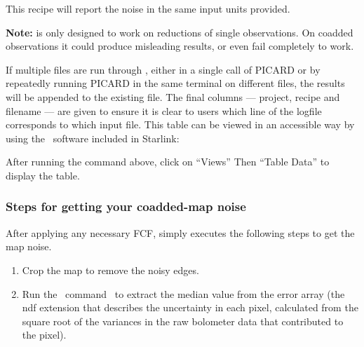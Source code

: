 \begin{terminalv}
\end{terminalv}
This recipe will report the noise in the same input units provided. 


\textbf{Note:}  is only designed to work on
reductions of single observations. On coadded observations it could
produce misleading results, or even fail completely to work.

If multiple files are run through , either in a single call
of PICARD or by repeatedly running PICARD in the same terminal on different
files, the results will be appended to the existing  file.
The final columns — project, recipe and filename — are given to ensure it
is clear to users which line of the logfile corresponds to which input file.
This table can be viewed in an accessible way by using the \topcat\ software
included in Starlink:

\begin{terminalv}
\end{terminalv}

After running the command above, click on “Views” Then “Table Data” to display the table.

\subsubsection*{Steps for getting your coadded-map noise}
After applying any necessary FCF,  simply
executes the following steps to get the map noise.

\begin{enumerate}
\item Crop the map to remove the noisy edges.

\begin{terminalv}
\end{terminalv}

\item Run the \Kappa\ command \stats\ to extract the median value from
the error array (the ndf extension that describes the uncertainty in each pixel, 
calculated from the square root of the variances in the raw bolometer data 
that contributed to the pixel).

\begin{terminalv}
\end{terminalv}

\end{enumerate}

